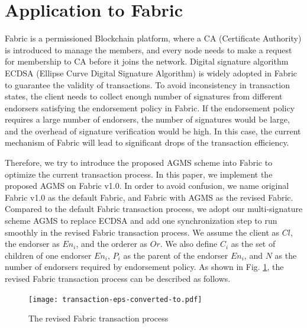 \documentclass[journal]{IEEEtran}
\begin{document}
\section{Application to Fabric}
Fabric \cite{11DBLP:conf/eurosys/AndroulakiBBCCC18} is a permissioned Blockchain platform, where a CA (Certificate Authority) is introduced to manage the members, and every node needs to make a request for membership to CA before it joins the network.
Digital signature algorithm ECDSA (Ellipse Curve Digital Signature Algorithm) is widely adopted in Fabric to guarantee the validity of transactions. To avoid inconsistency in transaction states, the client needs to collect enough number of signatures from different endorsers satisfying the endorsement policy in Fabric. If the endorsement policy requires a large number of endorsers, the number of signatures would be large, and the overhead of signature verification would be high. In this case, the current mechanism of Fabric will lead to significant drops of the transaction efficiency.

Therefore, we try to introduce the proposed AGMS scheme into Fabric to optimize the current transaction process. In this paper, we implement the proposed AGMS on Fabric v1.0. In order to avoid confusion, we name original Fabric v1.0 as the default Fabric, and Fabric with AGMS as the revised Fabric. Compared to the default Fabric transaction process, we adopt our multi-signature scheme AGMS to replace ECDSA and add one synchronization step to run smoothly in the revised Fabric transaction process.
We assume the client as \(Cl\), the endorser as \(En_i\), and the orderer as \(Or\). We also define \(C_i\) as the set of children of one endorser \(En_i\),  \(P_i\) as the parent of the endorser \(En_i\), and \(N\) as the number of endorsers required by endorsement policy. As shown in Fig. \ref{figtransaction}, the revised Fabric transaction process can be described as follows.

\begin{figure}
\texttt{[image: transaction-eps-converted-to.pdf]}
\caption{The revised Fabric transaction process}
\label{figtransaction}
\end{figure}
\end{document}

